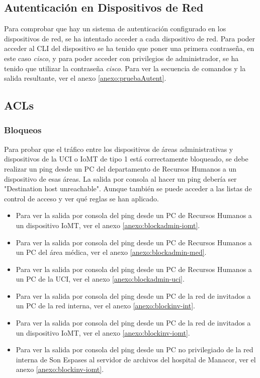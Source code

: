 \subsection{Autenticación en Dispositivos de Red}
Para comprobar que hay un sistema de autenticación configurado en los dispositivos de red, se ha intentado acceder a cada dispositivo de red. Para poder acceder al CLI del dispositivo se ha tenido que poner una primera contraseña, 
en este caso \textit{cisco}, y para poder acceder con privilegios de administrador, se ha tenido que utilizar la contraseña \textit{cisco}. Para ver la secuencia de comandos y la salida resultante, ver el anexo \ref{anexo:pruebaAutent}.

\subsection{ACLs}
\subsubsection{Bloqueos}
Para probar que el tráfico entre los dispositivos de áreas administrativas y dispositivos de la UCI o IoMT de tipo 1 está correctamente bloqueado, se debe realizar un ping desde un PC del departamento de Recursos Humanos 
a un dispositivo de esas áreas. La salida por consola al hacer un ping debería ser "Destination host unreachable". Aunque también se puede acceder a las listas de control de acceso y ver qué reglas se han aplicado.
\begin{itemize}
    \item Para ver la salida por consola del ping desde un PC de Recursos Humanos a un dispositivo IoMT, ver el anexo \ref{anexo:blockadmin-iomt}.
    \item Para ver la salida por consola del ping desde un PC de Recursos Humanos a un PC del área médica, ver el anexo \ref{anexo:blockadmin-med}.
    \item Para ver la salida por consola del ping desde un PC de Recursos Humanos a un PC de la UCI, ver el anexo \ref{anexo:blockadmin-uci}.
    \item Para ver la salida por consola del ping desde un PC de la red de invitados a un PC de la red interna, ver el anexo \ref{anexo:blockinv-int}.
    \item Para ver la salida por consola del ping desde un PC de la red de invitados a un dispositivo IoMT, ver el anexo \ref{anexo:blockinv-iomt}.
    \item Para ver la salida por consola del ping desde un PC no privilegiado de la red interna de Son Espases al servidor de archivos del hospital de Manacor, ver el anexo \ref{anexo:blockinv-iomt}.
\end{itemize}

